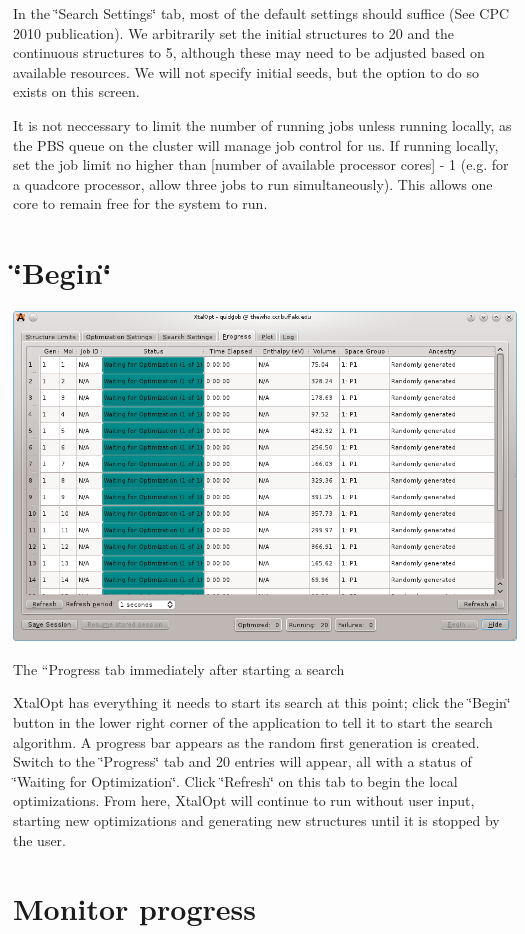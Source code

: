 In the \char`\"{}\+Search Settings\char`\"{} tab, most of the default settings should suffice (See C\+P\+C 2010 publication). We arbitrarily set the initial structures to 20 and the continuous structures to 5, although these may need to be adjusted based on available resources. We will not specify initial seeds, but the option to do so exists on this screen.

It is not neccessary to limit the number of running jobs unless running locally, as the P\+B\+S queue on the cluster will manage job control for us. If running locally, set the job limit no higher than \mbox{[}number of available processor cores\mbox{]} -\/ 1 (e.\+g. for a quadcore processor, allow three jobs to run simultaneously). This allows one core to remain free for the system to run.\hypertarget{tut-xo_begin}{}\section{\char`\"{}\+Begin\char`\"{}}\label{tut-xo_begin}

\begin{DoxyImage}
\includegraphics[width=\textwidth]{prog-start.png}
\caption{The ``\+Progress\textquotesingle{}\textquotesingle{} tab immediately after starting a search}
\end{DoxyImage}


Xtal\+Opt has everything it needs to start its search at this point; click the \char`\"{}\+Begin\char`\"{} button in the lower right corner of the application to tell it to start the search algorithm. A progress bar appears as the random first generation is created. Switch to the \char`\"{}\+Progress\char`\"{} tab and 20 entries will appear, all with a status of \char`\"{}\+Waiting for
\+Optimization\char`\"{}. Click \char`\"{}\+Refresh\char`\"{} on this tab to begin the local optimizations. From here, Xtal\+Opt will continue to run without user input, starting new optimizations and generating new structures until it is stopped by the user.\hypertarget{tut-xo_prog-mon}{}\section{Monitor progress}\label{tut-xo_prog-mon}

